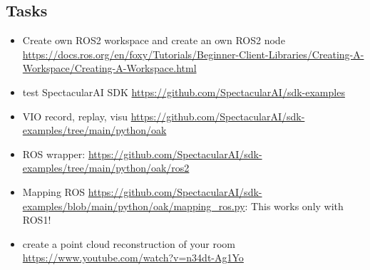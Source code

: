 \documentclass{article}
\begin{document}
\subsection{Tasks}
\begin{itemize}
\item Create own ROS2 workspace and create an own ROS2 node \url{https://docs.ros.org/en/foxy/Tutorials/Beginner-Client-Libraries/Creating-A-Workspace/Creating-A-Workspace.html} 
\item test SpectacularAI SDK \url{https://github.com/SpectacularAI/sdk-examples} 
\item VIO record, replay, visu \url{https://github.com/SpectacularAI/sdk-examples/tree/main/python/oak} 
\item ROS wrapper: \url{https://github.com/SpectacularAI/sdk-examples/tree/main/python/oak/ros2} 
\item Mapping ROS \url{https://github.com/SpectacularAI/sdk-examples/blob/main/python/oak/mapping_ros.py}: This works only with ROS1!
\item create a point cloud reconstruction of your room
\url{https://www.youtube.com/watch?v=n34dt-Ag1Yo} 
\end{itemize}
\end{document}

